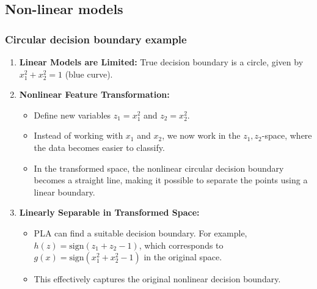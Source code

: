 \subsection{Non-linear models}
    \subsubsection{Circular decision boundary example}
    \begin{example}
        \begin{enumerate}

            \item \textbf{Linear Models are Limited:} True decision boundary is a circle, given by \( x_1^2 + x_2^2 = 1 \) (blue curve).
        
            \item \textbf{Nonlinear Feature Transformation:}
            \begin{itemize}
                \item Define new variables \( z_1 = x_1^2 \) and \( z_2 = x_2^2 \).
                \item Instead of working with \( x_1 \) and \( x_2 \), we now work in the \( z_1, z_2 \)-space, where the data becomes easier to classify.
                \item In the transformed space, the nonlinear circular decision boundary becomes a straight line, making it possible to separate the points using a linear boundary.
            \end{itemize}
        
            \item \textbf{Linearly Separable in Transformed Space:}
            \begin{itemize}
                \item PLA can find a suitable decision boundary. For example, \( h(z) = \text{sign}(z_1 + z_2 - 1) \), which corresponds to \( g(x) = \text{sign}(x_1^2 + x_2^2 - 1) \) in the original space.
                \item This effectively captures the original nonlinear decision boundary.
            \end{itemize}
        
        \end{enumerate}
    \end{example}

